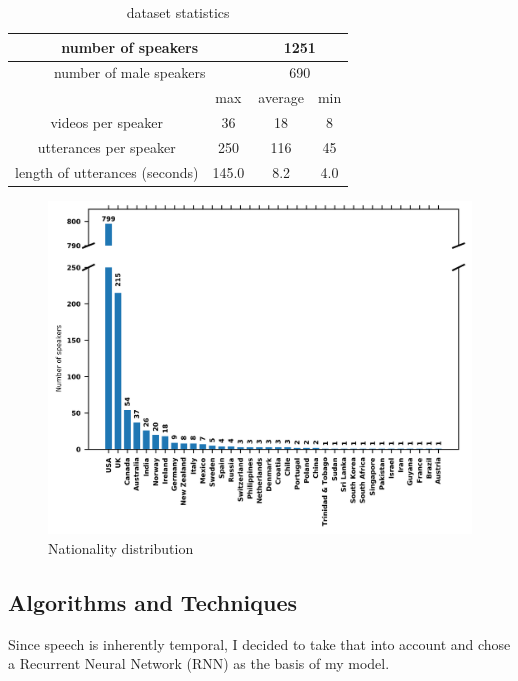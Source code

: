 \documentclass{article}
\begin{document}
\begin{table}[H]
    \centering
    \begin{tabular}{ |c||c|c|c|  }
    \hline
    \multicolumn{2}{|c|}{number of speakers} & \multicolumn{2}{|c|}{1251} \\
    \hline
    \multicolumn{2}{|c|}{number of male speakers} & \multicolumn{2}{|c|}{690} \\
    \hline
     & max & average & min \\
     \hline
    videos per speaker & 36 & 18 & 8 \\
    \hline
    utterances per speaker & 250 & 116 & 45 \\
    \hline
    length of utterances (seconds) & 145.0 & 8.2 & 4.0 \\
    \hline
    \end{tabular}
    \caption{dataset statistics}
    \label{tab:stats_1}
\end{table}
\begin{figure}[H]
    \centering
    \includegraphics[scale=.75]{images/country.png}
    \caption{Nationality distribution}
    \label{fig:stats_2}
\end{figure}

\subsection{Algorithms and Techniques}
Since speech is inherently temporal, I decided to take that into account and chose a Recurrent Neural Network (RNN) as the basis of my model.
\end{document}
